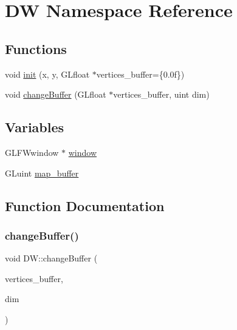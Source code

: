 \hypertarget{namespace_d_w}{}\section{DW Namespace Reference}
\label{namespace_d_w}
\subsection*{Functions}
\begin{DoxyCompactItemize}
\item 
void \mbox{\hyperlink{namespace_d_w_a0a4389e2521821df2a89c92314ef00ed}{init}} (x, y, G\+Lfloat $\ast$vertices\+\_\+buffer=\{0.\+0f\})
\item 
void \mbox{\hyperlink{namespace_d_w_a2a8851787a6f886e3cc91143851d78f8}{change\+Buffer}} (G\+Lfloat $\ast$vertices\+\_\+buffer, uint dim)
\end{DoxyCompactItemize}
\subsection*{Variables}
\begin{DoxyCompactItemize}
\item 
G\+L\+F\+Wwindow $\ast$ \mbox{\hyperlink{namespace_d_w_aab8c3528b21e62a229edce918c005236}{window}}
\item 
G\+Luint \mbox{\hyperlink{namespace_d_w_a888297366f850dc6344c0d54c57550c7}{map\+\_\+buffer}}
\end{DoxyCompactItemize}


\subsection{Function Documentation}
\mbox{\label{namespace_d_w_a2a8851787a6f886e3cc91143851d78f8}} 
\subsubsection{\texorpdfstring{changeBuffer()}{changeBuffer()}}
{\footnotesize\ttfamily void D\+W\+::change\+Buffer (\begin{DoxyParamCaption}\item[{G\+Lfloat $\ast$}]{vertices\+\_\+buffer,  }\item[{uint}]{dim }\end{DoxyParamCaption})}

\mbox{\label{namespace_d_w_a0a4389e2521821df2a89c92314ef00ed}} 
